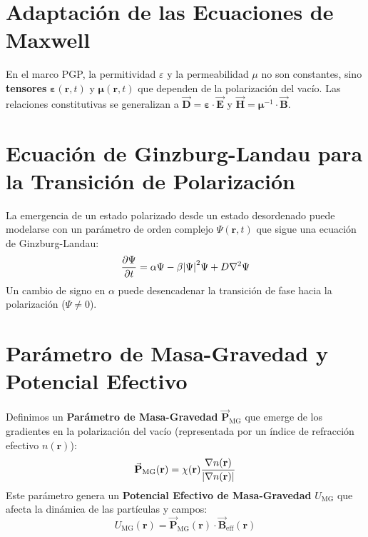 \documentclass{book} %
\newcommand{\bvec}[1]{\vec{\mathbf{#1}}} %
\begin{document}
\section{Adaptación de las Ecuaciones de Maxwell}
En el marco PGP, la permitividad $\varepsilon$ y la permeabilidad $\mu$ no son constantes, sino \textbf{tensores} $\boldsymbol{\varepsilon}(\mathbf{r}, t)$ y $\boldsymbol{\mu}(\mathbf{r}, t)$ que dependen de la polarización del vacío. Las relaciones constitutivas se generalizan a $\bvec{D} = \boldsymbol{\varepsilon} \cdot \bvec{E}$ y $\bvec{H} = \boldsymbol{\mu}^{-1} \cdot \bvec{B}$.

\section{Ecuación de Ginzburg-Landau para la Transición de Polarización}
La emergencia de un estado polarizado desde un estado desordenado puede modelarse con un parámetro de orden complejo $\Psi(\mathbf{r}, t)$ que sigue una ecuación de Ginzburg-Landau:
\begin{equation}
    \pdv{\Psi}{t} = \alpha \Psi - \beta \abs{\Psi}^2 \Psi + D \nabla^2 \Psi
    \label{eq:ginzburg_landau}
\end{equation}
Un cambio de signo en $\alpha$ puede desencadenar la transición de fase hacia la polarización ($\Psi \neq 0$).

\section{Parámetro de Masa-Gravedad y Potencial Efectivo}
Definimos un \textbf{Parámetro de Masa-Gravedad} $\bvec{P}_{\text{MG}}$ que emerge de los gradientes en la polarización del vacío (representada por un índice de refracción efectivo $n(\mathbf{r})$):
\begin{equation}
    \bvec{P}_{\text{MG}}(\mathbf{r}) = \chi(\mathbf{r}) \frac{\nabla n(\mathbf{r})}{\abs{\nabla n(\mathbf{r})}}
    \label{eq:pmg_definition}
\end{equation}
Este parámetro genera un \textbf{Potencial Efectivo de Masa-Gravedad} $U_{\text{MG}}$ que afecta la dinámica de las partículas y campos:
\begin{equation}
    U_{\text{MG}}(\mathbf{r}) = \bvec{P}_{\text{MG}}(\mathbf{r}) \cdot \bvec{B}_{\text{eff}}(\mathbf{r})
    \label{eq:umg_definition}
\end{equation}

\end{document}
